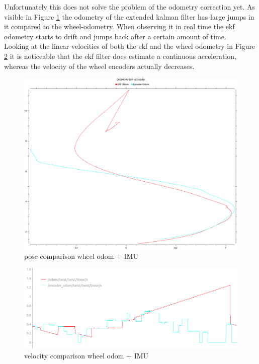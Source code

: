 Unfortunately this does not solve the problem of the odometry correction yet. As visible in Figure \ref{pose comparison wheel odom + IMU} the odometry of the extended kalman filter has large jumps in it compared to the wheel-odometry. When observing it in real time the ekf odometry starts to drift and jumps back after a certain amount of time.\\
Looking at the linear velocities of both the ekf and the wheel odometry in Figure \ref{velocity comparison wheel odom + IMU} it is noticeable that the ekf filter does estimate a continuous acceleration, whereas the velocity of the wheel encoders actually decreases.\\



\begin{figure}[H]
	\includegraphics[width=\textwidth]{Pictures/odom pose comp}
	\caption{pose comparison wheel odom + IMU}
	\label{pose comparison wheel odom + IMU}

\end{figure}

\begin{figure}[H]
	\includegraphics[width=\textwidth]{Pictures/comparison odom}
	\caption{velocity comparison wheel odom + IMU}
	\label{velocity comparison wheel odom + IMU}

\end{figure}


